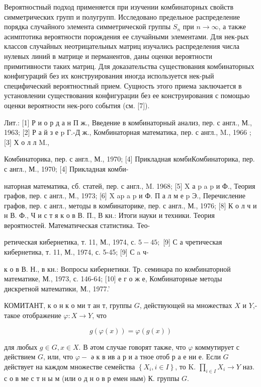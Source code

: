\documentclass[10pt]{article}
\begin{document}
Вероятностный подход применяется при изучении комбинаторных свойств симметрических групп и полугрупп. Исследовано предельное распределение порядка случайного элемента симметрической группы $S_{n}$ при $n \rightarrow \infty$, а также асимптотика вероятности порождения ее случайными элементами. Для нек-рых классов случайных неотрицательных матриц изучались распределения числа нулевых линий в матрице и перманентов, даны оценки вероятности примитивности таких матриц. Для доказательства существования комбинаторных конфигураций без их конструирования иногда используется нек-рый специфический вероятностный прием. Сущность этого приема заключается в установлении существования конфигурации без ее конструирования с помощью оценки вероятности нек-рого события (см. [7]).



Лит.: [1] Р и о р д а н П ж., Введение в комбинаторный анализ, пер. с англ., М., 1963; [2] Р а й з е p Г.-Д ж., Комбинаторная математика, пер. с англ., M., 1966 ; [3] Х о л л M.,

Комбинаторика, пер. с англ., М., 1970; [4] Прикладная комбиКомбинаторика, пер. с англ., М., 1970; [4] Прикладная комби-

наторная математика, сб. статей, пер. с англ., M. 1968; [5] X а p a p и Ф., Теория графов, пер. с англ., М., 1973; [6] X ap a p и Ф. П а л м е p Э., Перечисление графов, пер. с англ., методы в комбинаторике, пер. с англ., М., 1976; [8] К о л ч и н В. Ф., Ч и с т я к о в В. П., В кн.: Итоги науки и техники. Теория вероятностей. Математическая статистика. Тео-

ретическая кибернетика, т. 11, М., 1974, с. $5-45 ;$ [9] С а чретическая кибернетика, т. 11, М., 1974, с. 5-45; [9] С a ч-

к о в В. Н., в кн.: Вопросы кибернетики. Тр. семинара по комбинаторной математике, М., 1973, с. 146-64; [10] е г о ж е, Комбинаторные методы дискретной математики, М., 1977.'



КОМИТАНТ, к о н к о ми т ан т, группы $G$, действующей на множествах $X$ и $Y$,- такое отображение $\varphi: X \rightarrow Y$, что



\[

g(\varphi(x))=\varphi(g(x))

\]



для любых $g \in G, x \in X$. В әтом случае говорят также, что $\varphi$ коммутирует с действием $G$, или, что $\varphi-$ ә к в ив а р и а тное отоб р а е ни е. Если $G$ действует на каждом множестве семейства $\left\{X_{i}, i \in I\right\}$, то $\mathrm{K}$. $\prod_{i \in I} X_{i} \rightarrow Y$ наз. с о в ме с т н ы м (или о д н о в р емен ным) К. группы $G$.
\end{document}
